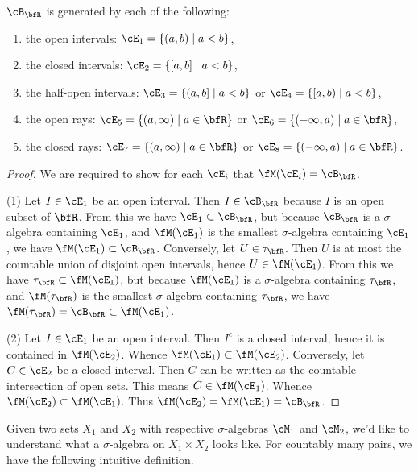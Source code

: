     \begin{proposition}
    $\cB_\bfR$ is generated by each of the following:
        \begin{enumerate}[label = (\arabic*),itemsep=1pt,topsep=3pt]
            \item the open intervals: $\cE_1 = \{(a,b) \mid a < b\}$,
            \item the closed intervals: $\cE_2 = \{[a,b] \mid a < b\}$,
            \item the half-open intervals: $\cE_3 = \{(a,b] \mid a < b\}$ or $\cE_4 = \{[a,b) \mid a < b\}$,
            \item the open rays: $\cE_5 = \{(a,\infty) \mid a \in \bfR\}$ or $\cE_6 = \{(-\infty,a) \mid a \in \bfR\}$,
            \item the closed rays: $\cE_7 = \{(a,\infty) \mid a \in \bfR\}$ or $\cE_8 = \{(-\infty,a) \mid a \in \bfR\}$.
        \end{enumerate}
    \end{proposition}
        \begin{proof}
            We are required to show for each $\cE_i$ that $\fM(\cE_i) = \cB_\bfR$.

            (1) Let $I \in \cE_1$ be an open interval. Then $I \in \cB_\bfR$ because $I$ is an open subset of $\bfR$. From this we have $\cE_1 \subset \cB_\bfR$, but because $\cB_\bfR$ is a $\sigma$-algebra containing $\cE_1$, and $\fM(\cE_1)$ is the smallest $\sigma$-algebra containing $\cE_1$, we have $\fM(\cE_1) \subset \cB_\bfR$. Conversely, let $U \in \tau_\bfR$. Then $U$ is at most the countable union of disjoint open intervals, hence $U \in \fM(\cE_1)$. From this we have $\tau_\bfR \subset \fM(\cE_1)$, but because $\fM(\cE_1)$ is a $\sigma$-algebra containing $\tau_\bfR$, and $\fM(\tau_\bfR)$ is the smallest $\sigma$-algebra containing $\tau_\bfR$, we have $\fM(\tau_\bfR) = \cB_\bfR \subset \fM(\cE_1)$.

            (2) Let $I \in \cE_1$ be an open interval. Then $I^c$ is a closed interval, hence it is contained in $\fM(\cE_2)$. Whence $\fM(\cE_1) \subset \fM(\cE_2)$. Conversely, let $C \in \cE_2$ be a closed interval. Then $C$ can be written as the countable intersection of open sets. This means $C \in \fM(\cE_1)$. Whence $\fM(\cE_2) \subset \fM(\cE_1)$. Thus $\fM(\cE_2) = \fM(\cE_1) = \cB_\bfR$.
        \end{proof}

    \newpage

    Given two sets $X_1$ and $X_2$ with respective $\sigma$-algebras $\cM_1$ and $\cM_2$, we'd like to understand what a $\sigma$-algebra on $X_1 \times X_2$ looks like. For countably many pairs, we have the following intuitive definition.

